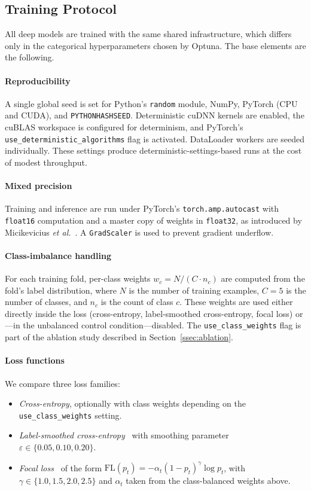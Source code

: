 \documentclass[conference]{IEEEtran}
\begin{document}
\subsection{Training Protocol}
\label{ssec:training}

All deep models are trained with the same shared infrastructure, which differs only in the categorical hyperparameters chosen by Optuna. The base elements are the following.

\paragraph{Reproducibility}
A single global seed is set for Python's \texttt{random} module, NumPy, PyTorch (CPU and CUDA), and \texttt{PYTHONHASHSEED}. Deterministic cuDNN kernels are enabled, the cuBLAS workspace is configured for determinism, and PyTorch's \texttt{use\_deterministic\_algorithms} flag is activated. DataLoader workers are seeded individually. These settings produce deterministic-settings-based runs at the cost of modest throughput.

\paragraph{Mixed precision}
Training and inference are run under PyTorch's \texttt{torch.amp.autocast} with \texttt{float16} computation and a master copy of weights in \texttt{float32}, as introduced by Micikevicius \emph{et al.}~\cite{micikevicius2018mixed}. A \texttt{GradScaler} is used to prevent gradient underflow.

\paragraph{Class-imbalance handling}
For each training fold, per-class weights $w_c = N / (C \cdot n_c)$ are computed from the fold's label distribution, where $N$ is the number of training examples, $C=5$ is the number of classes, and $n_c$ is the count of class $c$. These weights are used either directly inside the loss (cross-entropy, label-smoothed cross-entropy, focal loss) or---in the unbalanced control condition---disabled. The \texttt{use\_class\_weights} flag is part of the ablation study described in Section~\ref{ssec:ablation}.

\paragraph{Loss functions}
We compare three loss families:
\begin{itemize}
  \item \emph{Cross-entropy}, optionally with class weights depending on the \texttt{use\_class\_weights} setting.
  \item \emph{Label-smoothed cross-entropy}~\cite{szegedy2016label} with smoothing parameter $\varepsilon \in \{0.05, 0.10, 0.20\}$.
  \item \emph{Focal loss}~\cite{lin2017focal} of the form
        $\mathrm{FL}(p_t) = -\alpha_t (1-p_t)^{\gamma} \log p_t$,
        with $\gamma \in \{1.0, 1.5, 2.0, 2.5\}$ and $\alpha_t$ taken from the class-balanced weights above.
\end{itemize}
\end{document}
